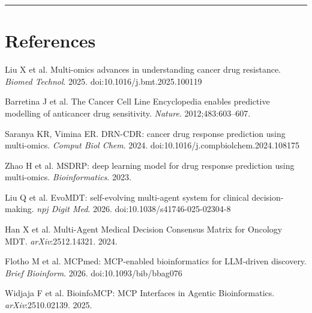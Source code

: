 \documentclass[11pt, letterpaper]{article}
\begin{document}
\vspace{0.5em}
\hrule
\vspace{0.4em}

\section*{References}

{\small
\begin{enumerate}[label={[\arabic*]},leftmargin=*,itemsep=1pt,parsep=0pt]

\item Liu X et al. Multi-omics advances in understanding cancer drug resistance.
      \textit{Biomed Technol}. 2025. doi:10.1016/j.bmt.2025.100119

\item Barretina J et al. The Cancer Cell Line Encyclopedia enables predictive modelling of
      anticancer drug sensitivity. \textit{Nature}. 2012;483:603--607.

\item Saranya KR, Vimina ER. DRN-CDR: cancer drug response prediction using multi-omics.
      \textit{Comput Biol Chem}. 2024. doi:10.1016/j.compbiolchem.2024.108175

\item Zhao H et al. MSDRP: deep learning model for drug response prediction using
      multi-omics. \textit{Bioinformatics}. 2023.

\item Liu Q et al. EvoMDT: self-evolving multi-agent system for clinical decision-making.
      \textit{npj Digit Med}. 2026. doi:10.1038/s41746-025-02304-8

\item Han X et al. Multi-Agent Medical Decision Consensus Matrix for Oncology MDT.
      \textit{arXiv}:2512.14321. 2024.

\item Flotho M et al. MCPmed: MCP-enabled bioinformatics for LLM-driven discovery.
      \textit{Brief Bioinform}. 2026. doi:10.1093/bib/bbag076

\item Widjaja F et al. BioinfoMCP: MCP Interfaces in Agentic Bioinformatics.
      \textit{arXiv}:2510.02139. 2025.

\end{enumerate}
}
\end{document}
